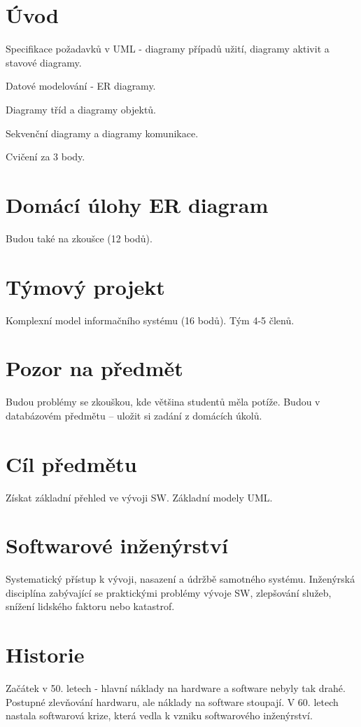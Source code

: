 \documentclass{article}
\begin{document}
\section{Úvod}
Specifikace požadavků v UML - diagramy případů užití, diagramy aktivit a stavové diagramy.

Datové modelování - ER diagramy.

Diagramy tříd a diagramy objektů.

Sekvenční diagramy a diagramy komunikace.

Cvičení za 3 body.

\section{Domácí úlohy ER diagram}
Budou také na zkoušce (12 bodů).

\section{Týmový projekt}
Komplexní model informačního systému (16 bodů). Tým 4-5 členů.

\section{Pozor na předmět}
Budou problémy se zkouškou, kde většina studentů měla potíže. Budou v databázovém předmětu – uložit si zadání z domácích úkolů.

\section{Cíl předmětu}
Získat základní přehled ve vývoji SW. Základní modely UML.

\section{Softwarové inženýrství}
Systematický přístup k vývoji, nasazení a údržbě samotného systému. Inženýrská disciplína zabývající se praktickými problémy vývoje SW, zlepšování služeb, snížení lidského faktoru nebo katastrof.

\section{Historie}
Začátek v 50. letech - hlavní náklady na hardware a software nebyly tak drahé. Postupné zlevňování hardwaru, ale náklady na software stoupají. V 60. letech nastala softwarová krize, která vedla k vzniku softwarového inženýrství.
\end{document}
